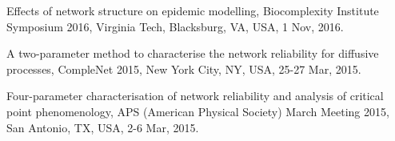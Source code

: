 \begin{zitemize}
\item 
Effects of network structure on epidemic modelling, Biocomplexity Institute Symposium 2016, Virginia Tech, Blacksburg, VA, USA, 1 Nov, 2016.

\item
A two-parameter method to characterise the network reliability for diffusive processes, CompleNet 2015, New York City, NY, USA, 25-27 Mar, 2015.

\item
Four-parameter characterisation of network reliability and analysis of critical point phenomenology, APS (American Physical Society) March Meeting 2015, San Antonio, TX, USA, 2-6 Mar, 2015.

\end{zitemize}